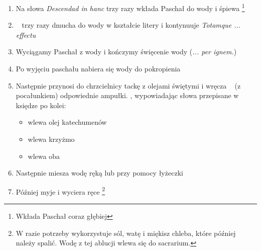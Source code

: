 \begin{enumerate}
      \item Na słowa \textit{Descendad in hanc} trzy razy wkłada Paschał do wody
            i śpiewa \footnote{Wkłada Paschał coraz głębiej}
      \item \ii~ trzy razy dmucha do wody w kształcie litery
            \textcolor{red}{\raisebox{-1mm}{\Large ${\Psi}$}} i kontynuuje
            \textit{Totamque ... effectu}
      \item Wyciągamy Paschał z wody i kończymy święcenie wody (\textit{... per
                  ignem.})
      \item Po wyjęciu paschału nabiera się wody do pokropienia
      \item Następnie  przynosi do chrzcielnicy tackę z olejami świętymi i
            wręcza \ii~ (z pocałunkiem) odpowiednie ampułki. \ii, wypowiadając
            słowa przepisane w księdze po kolei:
            \begin{itemize}
                  \item wlewa olej katechumenów
                  \item wlewa krzyżmo
                  \item wlewa oba
            \end{itemize}
      \item Następnie miesza wodę ręką lub przy pomocy łyżeczki
      \item Później myje i wyciera ręce \footnote{W razie potrzeby wykorzystuje
                  sól, watę i miękisz chleba, które później należy spalić. Wodę
                  z tej ablucji wlewa
                  się do sacrarium.}
\end{enumerate}

